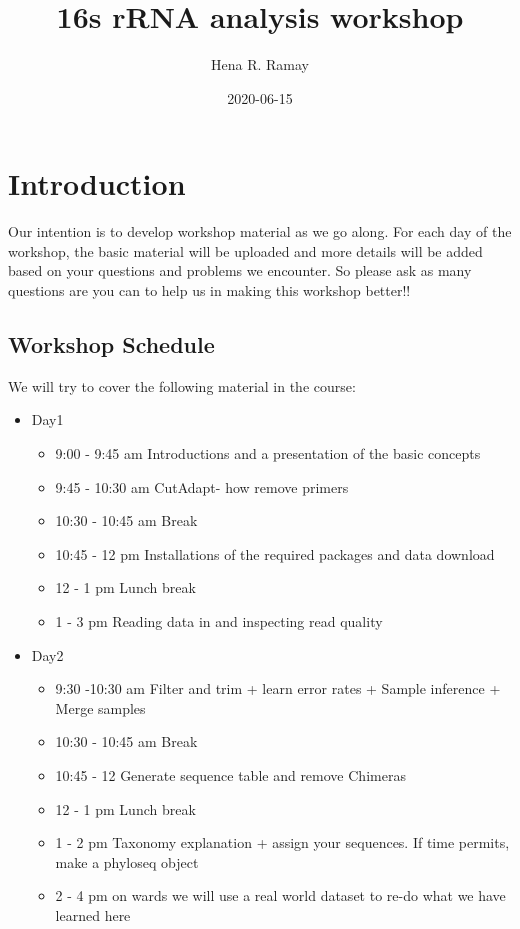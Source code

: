 \documentclass[
]{book}
\title{16s rRNA analysis workshop}
\author{Hena R. Ramay}
\date{2020-06-15}
\providecommand{\tightlist}{%
  \setlength{\itemsep}{0pt}\setlength{\parskip}{0pt}}
\begin{document}
\maketitle

{
\setcounter{tocdepth}{1}
\tableofcontents
}
\hypertarget{introduction}{%
\chapter{Introduction}\label{introduction}}

Our intention is to develop workshop material as we go along. For each day of the workshop, the basic material will be uploaded and more details will be added based on your questions and problems we encounter. So please ask as many questions are you can to help us in making this workshop better!!

\hypertarget{workshop-schedule}{%
\section{Workshop Schedule}\label{workshop-schedule}}

We will try to cover the following material in the course:

\begin{itemize}
\tightlist
\item
  Day1

  \begin{itemize}
  \tightlist
  \item
    9:00 - 9:45 am Introductions and a presentation of the basic concepts
  \item
    9:45 - 10:30 am CutAdapt- how remove primers
  \item
    10:30 - 10:45 am Break
  \item
    10:45 - 12 pm Installations of the required packages and data download
  \item
    12 - 1 pm Lunch break
  \item
    1 - 3 pm Reading data in and inspecting read quality
  \end{itemize}
\item
  Day2

  \begin{itemize}
  \tightlist
  \item
    9:30 -10:30 am Filter and trim + learn error rates + Sample inference + Merge samples
  \item
    10:30 - 10:45 am Break
  \item
    10:45 - 12 Generate sequence table and remove Chimeras
  \item
    12 - 1 pm Lunch break
  \item
    1 - 2 pm Taxonomy explanation + assign your sequences. If time permits, make a phyloseq object
  \item
    2 - 4 pm on wards we will use a real world dataset to re-do what we have learned here
  \end{itemize}
\end{itemize}
\end{document}
